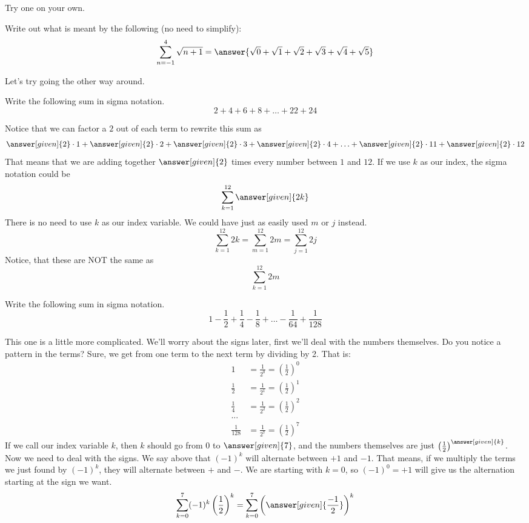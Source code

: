 \documentclass[12pt]{ximera}
\begin{document}
Try one on your own.
\begin{question}
	Write out what is meant by the following (no need to simplify):
	\[ \sum_{n=-1}^{4} \sqrt{n+1} =\answer{\sqrt{0}+\sqrt{1}+\sqrt{2}+\sqrt{3}+\sqrt{4}+\sqrt{5}}\]
\end{question}


Let's try going the other way around.
\begin{example}
	Write the following sum in sigma notation.
	\[ 2 + 4 + 6 + 8 + \ldots + 22 + 24 \]
	\begin{explanation}
		Notice that we can factor a $2$ out of each term to rewrite this sum as
		\[ \answer[given]{2}\cdot 1 + \answer[given]{2} \cdot 2 + \answer[given]{2}\cdot 3 + \answer[given]{2} \cdot 4 + \ldots + \answer[given]{2}\cdot 11 + \answer[given]{2}\cdot 12 \]
		That means that we are adding together $\answer[given]{2}$ times every number between $1$ and $12$.  If we use $k$ as our index, the sigma notation could be
		\[ \sum_{k=1}^{12} \answer[given]{2k} \]
		There is no need to use $k$ as our index variable.  We could have just as easily used $m$ or $j$ instead.
		\[ \sum_{k=1}^{12} 2k = \sum_{m=1}^{12} 2m = \sum_{j=1}^{12} 2j\]  
		Notice, that these are NOT the same as
		\[ \sum_{k=1}^{12} 2m \]
	\end{explanation}
\end{example}


\begin{example}
	Write the following sum in sigma notation.
	\[ 1 - \frac{1}{2} + \frac{1}{4} - \frac{1}{8} + \ldots - \frac{1}{64} + \frac{1}{128}  \]
	\begin{explanation}
		This one is a little more complicated.  We'll worry about the signs later, first we'll deal with the numbers themselves.  Do you notice a pattern in the terms?
		Sure, we get from one term to the next term by dividing by 2.  That is:
		\begin{align*}
			1 &= \frac{1}{2^0} = \left(\frac{1}{2}\right)^0\\
			\frac{1}{2} &= \frac{1}{2^1} = \left(\frac{1}{2}\right)^{1}\\
			\frac{1}{4} &= \frac{1}{2^2} = \left(\frac{1}{2}\right)^{2}\\
				 ...  \\
			 \frac{1}{128} &= \frac{1}{2^7} = \left(\frac{1}{2}\right)^{7}
		\end{align*}
		If we call our index variable $k$, then $k$ should go from $0$ to $\answer[given]{7}$, and the numbers themselves are just $\left(\frac{1}{2}\right)^{\answer[given]{k}}$.  Now we need to deal with the signs.
		We say above that $(-1)^k$ will alternate between $+1$ and $-1$.  That means, if we multiply the terms we just found by $(-1)^k$, they will alternate between $+$ and $-$.  
		We are starting with $k=0$, so $(-1)^0 = +1$ will give us the alternation starting at the sign we want.
		\[ \sum_{k=0}^{7} (-1)^k \left(\frac{1}{2}\right)^{k} = \sum_{k=0}^7 \left( \answer[given]{\frac{-1}{2}} \right)^k \]
	\end{explanation}
\end{example}
 
\end{document}
